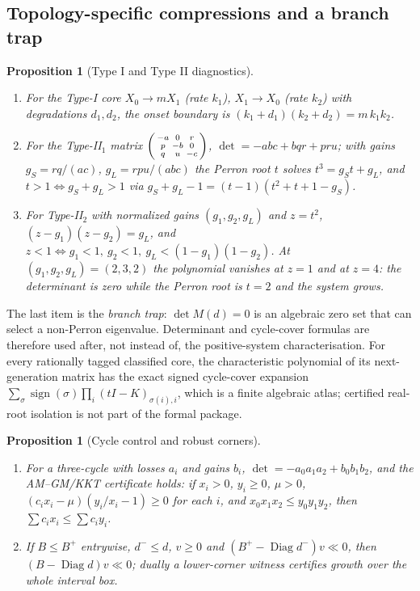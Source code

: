 \documentclass[11pt,a4paper]{article}
\theoremstyle{plain}
\newtheorem{proposition}[theorem]{Proposition}
\theoremstyle{definition}
\theoremstyle{remark}
\newcommand{\Diag}{\operatorname{Diag}}
\begin{document}
\subsection{Topology-specific compressions and a branch trap}

\begin{proposition}[Type I and Type II diagnostics]\label{prop:types}
\begin{enumerate}[label=(\roman*)]
\item For the Type-I core $X_0\to mX_1$ (rate $k_1$), $X_1\to X_0$ (rate $k_2$) with degradations $d_1,d_2$, the onset boundary is $(k_1+d_1)(k_2+d_2)=m\,k_1k_2$.
\item For the Type-II$_1$ matrix $\begin{psmallmatrix}-a&0&r\\ p&-b&0\\ q&u&-c\end{psmallmatrix}$, $\det=-abc+bqr+pru$; with gains $g_S=rq/(ac)$, $g_L=rpu/(abc)$ the Perron root $t$ solves $t^3=g_St+g_L$, and $t>1\iff g_S+g_L>1$ via $g_S+g_L-1=(t-1)(t^2+t+1-g_S)$.
\item For Type-II$_2$ with normalized gains $(g_1,g_2,g_L)$ and $z=t^2$, $(z-g_1)(z-g_2)=g_L$, and $z<1\iff g_1<1,\ g_2<1,\ g_L<(1-g_1)(1-g_2)$. At $(g_1,g_2,g_L)=(2,3,2)$ the polynomial vanishes at $z=1$ and at $z=4$: the determinant is zero while the Perron root is $t=2$ and the system grows.
\end{enumerate}
\end{proposition}

The last item is the \emph{branch trap}: $\det M(d)=0$ is an algebraic zero set that can select a non-Perron eigenvalue. Determinant and cycle-cover formulas are therefore used after, not instead of, the positive-system characterisation. For every rationally tagged classified core, the characteristic polynomial of its next-generation matrix has the exact signed cycle-cover expansion $\sum_\sigma\operatorname{sign}(\sigma)\prod_i(tI-K)_{\sigma(i),i}$, which is a finite algebraic atlas; certified real-root isolation is not part of the formal package.

\begin{proposition}[Cycle control and robust corners]\label{prop:control}
\begin{enumerate}[label=(\roman*)]
\item For a three-cycle with losses $a_i$ and gains $b_i$, $\det=-a_0a_1a_2+b_0b_1b_2$, and the AM--GM/KKT certificate holds: if $x_i>0$, $y_i\ge 0$, $\mu>0$, $(c_ix_i-\mu)(y_i/x_i-1)\ge 0$ for each $i$, and $x_0x_1x_2\le y_0y_1y_2$, then $\sum c_ix_i\le\sum c_iy_i$.
\item If $B\le B^+$ entrywise, $d^-\le d$, $v\ge 0$ and $(B^+-\Diag d^-)v\ll 0$, then $(B-\Diag d)v\ll 0$; dually a lower-corner witness certifies growth over the whole interval box.
\end{enumerate}
\end{proposition}
\end{document}
